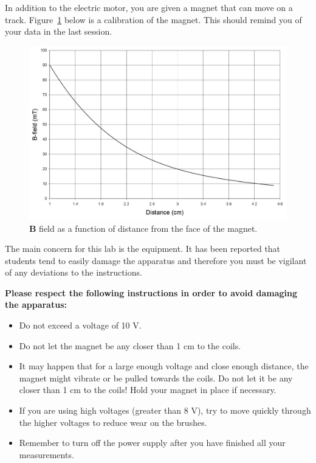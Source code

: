 \documentclass[12pt]{report}
\begin{document}
In addition to the electric motor, you are given a magnet that can move on a track. 
Figure~\ref{Fig:lab3-sessionb-calibration-bfield} below is a calibration of the magnet. This should remind you of your data in the last session. \\

\begin{figure}[h]
\centering
\includegraphics[scale=0.8]{lab3-sessionb-calibration-bfield}
\caption{$\mathbf{B}$ field as a function of distance from the face of the magnet.}
\label{Fig:lab3-sessionb-calibration-bfield}
\end{figure}


\begin{tcolorbox}
The main concern for this lab is the equipment. It has been reported that students tend to easily damage the apparatus and therefore you must be vigilant of any deviations to the instructions.
\end{tcolorbox}

\large \textbf{Please respect the following instructions in order to avoid damaging the apparatus:} \normalsize
\begin{itemize}
\item Do not exceed a voltage of 10 V.
\item Do not let the magnet be any closer than 1 cm to the coils.
\item It may happen that for a large enough voltage and close enough distance, the magnet might vibrate or be pulled towards the coils. Do not let it be any closer than 1 cm to the coils! Hold your magnet in place if necessary.
\item If you are using high voltages (greater than 8 V), try to move quickly through the higher voltages to reduce wear on the brushes.
\item Remember to turn off the power supply after you have finished all your measurements.
\end{itemize}
\end{document}
